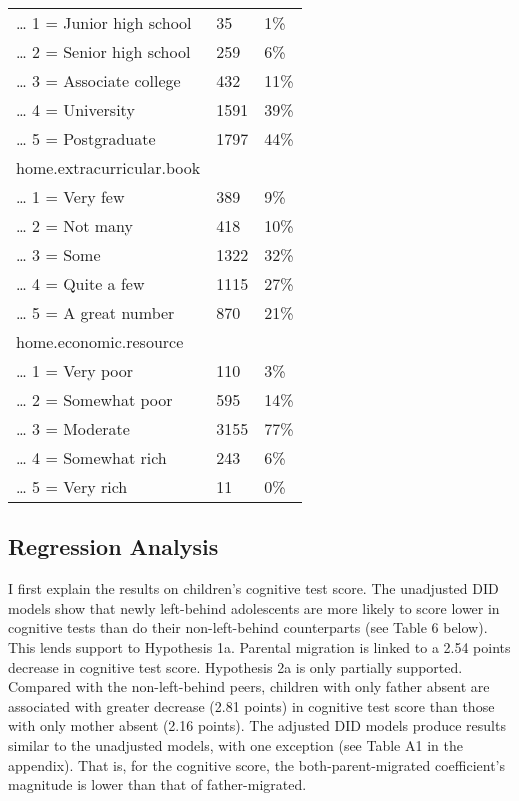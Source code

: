 \documentclass[
  man,floatsintext]{apa7}
\begin{document}
\begin{longtable}[]{@{}lll@{}}
\ldots{} 1 = Junior high school & 35 & 1\% \\
\ldots{} 2 = Senior high school & 259 & 6\% \\
\ldots{} 3 = Associate college & 432 & 11\% \\
\ldots{} 4 = University & 1591 & 39\% \\
\ldots{} 5 = Postgraduate & 1797 & 44\% \\
home.extracurricular.book & & \\
\ldots{} 1 = Very few & 389 & 9\% \\
\ldots{} 2 = Not many & 418 & 10\% \\
\ldots{} 3 = Some & 1322 & 32\% \\
\ldots{} 4 = Quite a few & 1115 & 27\% \\
\ldots{} 5 = A great number & 870 & 21\% \\
home.economic.resource & & \\
\ldots{} 1 = Very poor & 110 & 3\% \\
\ldots{} 2 = Somewhat poor & 595 & 14\% \\
\ldots{} 3 = Moderate & 3155 & 77\% \\
\ldots{} 4 = Somewhat rich & 243 & 6\% \\
\ldots{} 5 = Very rich & 11 & 0\% \\
\bottomrule()
\end{longtable}

\newpage

\hypertarget{regression-analysis}{%
\subsection{Regression Analysis}\label{regression-analysis}}

I first explain the results on children's cognitive test score. The unadjusted DID models show that newly left-behind adolescents are more likely to score lower in cognitive tests than do their non-left-behind counterparts (see Table 6 below). This lends support to Hypothesis 1a. Parental migration is linked to a 2.54 points decrease in cognitive test score. Hypothesis 2a is only partially supported. Compared with the non-left-behind peers, children with only father absent are associated with greater decrease (2.81 points) in cognitive test score than those with only mother absent (2.16 points). The adjusted DID models produce results similar to the unadjusted models, with one exception (see Table A1 in the appendix). That is, for the cognitive score, the both-parent-migrated coefficient's magnitude is lower than that of father-migrated.
\end{document}
